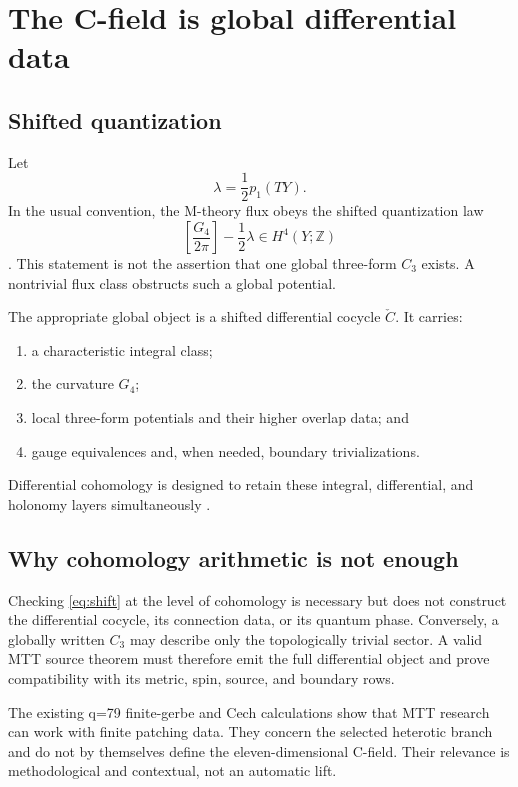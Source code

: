 \documentclass[11pt]{article}
\theoremstyle{definition}
\theoremstyle{remark}
\begin{document}
\section{The C-field is global differential data}
\label{sec:cfield}

\subsection{Shifted quantization}

Let
\[
\lambda=\frac12 p_1(TY).
\]
In the usual convention, the M-theory flux obeys the shifted quantization
law
\begin{equation}
\left[\frac{G_4}{2\pi}\right]-\frac12\lambda
\in H^4(Y;\mathbb Z)
\label{eq:shift}
\end{equation}
\cite{Witten1997}.  This statement is not the assertion that one global
three-form \(C_3\) exists.  A nontrivial flux class obstructs such a global
potential.

The appropriate global object is a shifted differential cocycle
\(\check C\).  It carries:
\begin{enumerate}[leftmargin=1.7em]
\item a characteristic integral class;
\item the curvature \(G_4\);
\item local three-form potentials and their higher overlap data; and
\item gauge equivalences and, when needed, boundary trivializations.
\end{enumerate}
Differential cohomology is designed to retain these integral, differential,
and holonomy layers simultaneously \cite{HopkinsSinger2005,Freed2000}.

\subsection{Why cohomology arithmetic is not enough}

Checking \cref{eq:shift} at the level of cohomology is necessary but does not
construct the differential cocycle, its connection data, or its quantum
phase.  Conversely, a globally written \(C_3\) may describe only the
topologically trivial sector.  A valid MTT source theorem must therefore
emit the full differential object and prove compatibility with its metric,
spin, source, and boundary rows.

The existing q=79 finite-gerbe and Cech calculations show that MTT research
can work with finite patching data.  They concern the selected heterotic
branch and do not by themselves define the eleven-dimensional C-field.
Their relevance is methodological and contextual, not an automatic lift.
\end{document}

